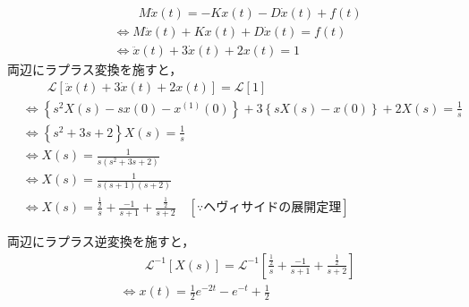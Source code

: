 \documentclass[a4paper,12pt]{article}
\begin{document}
\begin{tcolorbox}[title={6.(2)各パラメータを\(M=1,D=3,K=2,f(t)=1\)として、\(x(t)\)を求めよ。
    }]
    \begin{align*}
        &\qquad M\ddot{x}(t) = - Kx(t) - D \dot{x}(t) + f(t) \\
        &\Leftrightarrow M\ddot{x}(t) + Kx(t) + D \dot{x}(t) = f(t) \\
        &\Leftrightarrow \ddot{x}(t) + 3 \dot{x}(t) + 2x(t)= 1
    \end{align*}
    \quad 両辺にラプラス変換を施すと，
    \vspace{-3mm}
    \begin{align*}
        &\qquad \mathcal{L}\left[ \ddot{x}(t) + 3 \dot{x}(t) + 2x(t) \right] 
        = \mathcal{L} \left[ 1 \right] \\
        &\Leftrightarrow \left\{ s^2 X(s) - sx(0) - x^{(1)}(0) \right\}
        + 3\left\{ sX(s) - x(0) \right\}
        + 2 X(s) = \frac{1}{s}  \\
        &\Leftrightarrow \left\{ s^2 + 3s + 2 \right\} X(s)= \frac{1}{s}  \\
        &\Leftrightarrow X(s) = \frac{1}{s(s^2 + 3s + 2)}  \\
        &\Leftrightarrow X(s) =  \frac{1}{ s (s + 1)(s + 2) }  \\
        &\Leftrightarrow X(s) =  \frac{\frac{1}{2}}{ s } + \frac{ -1 }{ s + 1 } + \frac{  \frac{1}{2} }{ s + 2 } 
        \quad \left[\because ヘヴィサイドの展開定理 \right]
    \end{align*}
        
    \quad 両辺にラプラス逆変換を施すと，
    \vspace{-3mm}
    \begin{align*}
    &\qquad \mathcal{L}^{-1} \left[ X(s) \right] 
    = \mathcal{L}^{-1} \left[\frac{\frac{1}{2}}{ s } + \frac{ -1 }{ s + 1 } + \frac{  \frac{1}{2} }{ s + 2 }  \right] \\
    &\Leftrightarrow x(t) =\frac{1}{2}e^{-2t} - e^{-t} + \frac{1}{2}
    \end{align*}
\end{tcolorbox}

\begin{tcolorbox}[title={6.(3) (2)で求めた\(x(t)\)の概形を描け。なお、グラフの横軸を時間\(t\)、縦軸を変位\(x(t)\) 
    }]
    \begin{center}
    \end{center}
\end{tcolorbox}
\end{document}

